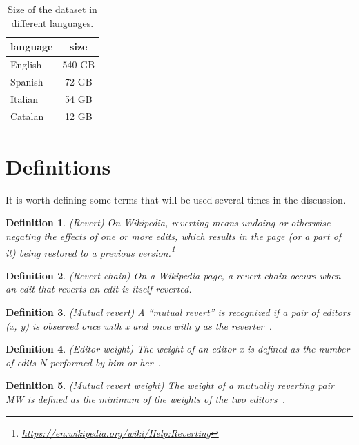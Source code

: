 \begin{table}[H]
    \centering
    \begin{tabularx}{\columnwidth}{@{}Xc@{}}
        \midrule
        \textbf{language} & \textbf{size}\\ \toprule
        English & 540 GB \\
        Spanish & 72 GB \\
        Italian & 54 GB \\
        Catalan & 12 GB \\

         \bottomrule
    \end{tabularx}
    
    \caption{Size of the dataset in different languages. \label{table:datasetsize}}
\end{table}

\section{Definitions}
It is worth defining some terms that will be used several times in the discussion.
\newtheorem{Definition}{Definition}
\begin{Definition}
    (Revert) On Wikipedia, reverting means undoing or otherwise negating the effects of one or more edits,
    which results in the page (or a part of it) being restored to a previous version.\footnote{\url{https://en.wikipedia.org/wiki/Help:Reverting}} %
\end{Definition}

\begin{Definition}
    (Revert chain) On a Wikipedia page, a revert chain occurs when an edit that reverts an edit is itself reverted.
\end{Definition}

\begin{Definition}
    (Mutual revert) A “mutual revert” is recognized if a pair of editors (x, y) is observed once with x and once with y as the reverter~\cite{Yasseri2014}.
\end{Definition}

\begin{Definition}
    (Editor weight) The weight of an editor x is defined as the number of edits N performed by him or her~\cite{Yasseri2014}.
\end{Definition}

\begin{Definition}
    (Mutual revert weight) The weight of a mutually reverting pair MW is defined as the minimum of the weights of the two editors~\cite{Yasseri2014}.
\end{Definition}

